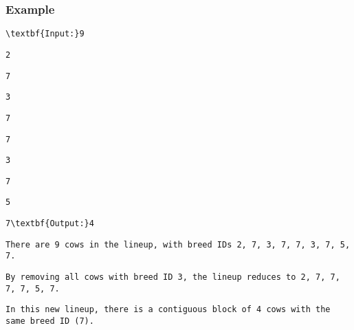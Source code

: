\subsubsection{Example}
\begin{verbatim}
\textbf{Input:}9 \end{verbatim}
\begin{verbatim}
2 \end{verbatim}
\begin{verbatim}
7 \end{verbatim}
\begin{verbatim}
3 \end{verbatim}
\begin{verbatim}
7 \end{verbatim}
\begin{verbatim}
7 \end{verbatim}
\begin{verbatim}
3 \end{verbatim}
\begin{verbatim}
7 \end{verbatim}
\begin{verbatim}
5 \end{verbatim}
\begin{verbatim}
7\textbf{Output:}4\end{verbatim}
\begin{verbatim}
There are 9 cows in the lineup, with breed IDs 2, 7, 3, 7, 7, 3, 7, 5, 7.\end{verbatim}
\begin{verbatim}
By removing all cows with breed ID 3, the lineup reduces to 2, 7, 7, 7, 7, 5, 7.  \end{verbatim}
\begin{verbatim}
In this new lineup, there is a contiguous block of 4 cows with the same breed ID (7).\end{verbatim}